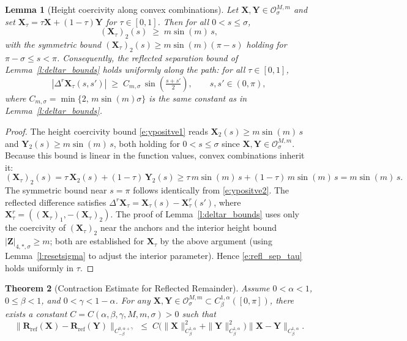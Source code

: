 \documentclass{amsart}
\newtheorem{theorem}{Theorem}[section]
\newtheorem{lemma}[theorem]{Lemma}
\begin{document}
\begin{lemma}[Height coercivity along convex combinations]
\label{lem:convex_height}
Let $\mathbf{X}, \mathbf{Y} \in \mathcal{O}^{M,m}_\sigma$ and set
$\mathbf{X}_\tau = \tau\mathbf{X} + (1-\tau)\mathbf{Y}$ for $\tau \in [0,1]$.
Then for all $0 < s \leq \sigma$,
\[
  (\mathbf{X}_\tau)_2(s) \;\geq\; m\sin(m)\,s,
\]
with the symmetric bound $(\mathbf{X}_\tau)_2(s) \geq m\sin(m)(\pi - s)$ holding
for $\pi - \sigma \leq s < \pi$.
Consequently, the reflected separation bound of Lemma~\ref{l:deltar_bounds}
holds uniformly along the path: for all $\tau \in [0,1]$,
\begin{equation}\label{e:refl_sep_tau}
  |\Delta^r \mathbf{X}_\tau(s,s')|
  \;\geq\;
  C_{m,\sigma}\,\sin\!\left(\tfrac{s+s'}{2}\right),
  \qquad s,s' \in (0,\pi),
\end{equation}
where $C_{m,\sigma} = \min\{2,\, m\sin(m)\sigma\}$ is the same constant as
in Lemma~\ref{l:deltar_bounds}.
\end{lemma}

\begin{proof}
The height coercivity bound \eqref{e:ypositve1} reads
$\mathbf{X}_2(s) \geq m\sin(m)\,s$ and $\mathbf{Y}_2(s) \geq m\sin(m)\,s$,
both holding for $0 < s \leq \sigma$ since $\mathbf{X}, \mathbf{Y} \in \mathcal{O}^{M,m}_\sigma$.
Because this bound is linear in the function values, convex combinations inherit it:
\[
  (\mathbf{X}_\tau)_2(s)
  = \tau\,\mathbf{X}_2(s) + (1-\tau)\,\mathbf{Y}_2(s)
  \geq \tau\,m\sin(m)\,s + (1-\tau)\,m\sin(m)\,s
  = m\sin(m)\,s.
\]
The symmetric bound near $s = \pi$ follows identically from \eqref{e:ypositve2}.
The reflected difference satisfies
$\Delta^r\mathbf{X}_\tau = \mathbf{X}_\tau(s) - \mathbf{X}_\tau^r(s')$,
where $\mathbf{X}_\tau^r = ((\mathbf{X}_\tau)_1, -(\mathbf{X}_\tau)_2)$.
The proof of Lemma~\ref{l:deltar_bounds} uses only the coercivity of
$(\mathbf{X}_\tau)_2$ near the anchors and the interior height bound
$|\mathbf{Z}|_{4,*,\sigma} \geq m$; both are established for $\mathbf{X}_\tau$
by the above argument (using Lemma~\ref{l:resetsigma} to adjust the interior
parameter). Hence \eqref{e:refl_sep_tau} holds uniformly in $\tau$.
\end{proof}


\begin{theorem}[Contraction Estimate for Reflected Remainder]
\label{thm:contraction_reflected}
Assume $0 < \alpha < 1$, $0 \leq \beta < 1$, and $0 < \gamma < 1 - \alpha$.
For any $\mathbf{X}, \mathbf{Y} \in \mathcal{O}^{M,m}_\sigma \subset C^{1,\alpha}_\beta([0,\pi])$,
there exists a constant $C = C(\alpha, \beta, \gamma, M, m, \sigma) > 0$ such that
\begin{equation}\label{e:ref_contraction}
  \|\mathbf{R}_{\mathrm{ref}}(\mathbf{X}) - \mathbf{R}_{\mathrm{ref}}(\mathbf{Y})\|_{C^{0,\alpha+\gamma}_{-\beta}}
  \;\leq\;
  C\bigl(\|\mathbf{X}\|_{C^{1,\alpha}_\beta}^2 + \|\mathbf{Y}\|_{C^{1,\alpha}_\beta}^2\bigr)
  \|\mathbf{X} - \mathbf{Y}\|_{C^{1,\alpha}_\beta}.
\end{equation}
\end{theorem}
\end{document}
